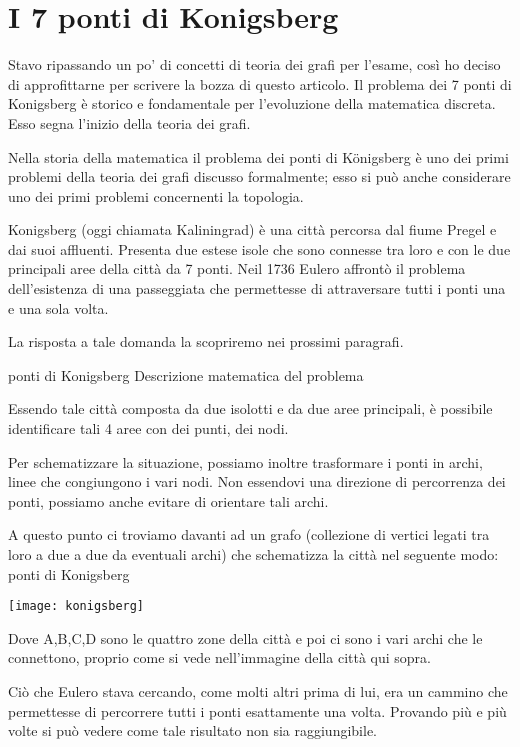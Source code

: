 \chapter{I 7 ponti di Konigsberg}
Stavo ripassando un po’ di concetti di teoria dei grafi per l’esame, così ho deciso di approfittarne per scrivere la bozza di questo articolo. Il problema dei 7 ponti di Konigsberg è storico e fondamentale per l’evoluzione della matematica discreta. Esso segna l’inizio della teoria dei grafi.

Nella storia della matematica il problema dei ponti di Königsberg è uno dei primi problemi della teoria dei grafi discusso formalmente; esso si può anche considerare uno dei primi problemi concernenti la topologia.

Konigsberg (oggi chiamata Kaliningrad) è una città percorsa dal fiume Pregel e dai suoi affluenti. Presenta due estese isole che sono connesse tra loro e con le due principali aree della città da 7 ponti. Neil 1736 Eulero affrontò il problema dell’esistenza di una passeggiata che permettesse di attraversare tutti i ponti una e una sola volta.

La risposta a tale domanda la scopriremo nei prossimi paragrafi.

ponti di Konigsberg
Descrizione matematica del problema

Essendo tale città composta da due isolotti e da due aree principali, è possibile identificare tali 4 aree con dei punti, dei nodi.

Per schematizzare la situazione, possiamo inoltre trasformare i ponti in archi, linee che congiungono i vari nodi. Non essendovi una direzione di percorrenza dei ponti, possiamo anche evitare di orientare tali archi.

A questo punto ci troviamo davanti ad un grafo (collezione di vertici legati tra loro a due a due da eventuali archi) che schematizza la città nel seguente modo:
ponti di Konigsberg

\begin{figure*}
	\centering
	\texttt{[image: konigsberg]}
\end{figure*}

Dove A,B,C,D sono le quattro zone della città e poi ci sono i vari archi che le connettono, proprio come si vede nell’immagine della città qui sopra.

Ciò che Eulero stava cercando, come molti altri prima di lui,  era un cammino che permettesse di percorrere tutti i ponti esattamente una volta. Provando più e più volte si può vedere come tale risultato non sia raggiungibile.

